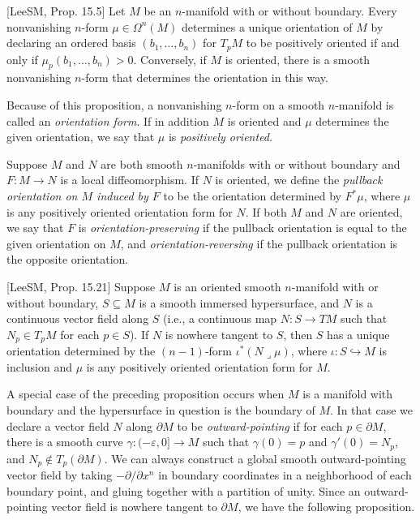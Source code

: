 \begin{proposition}
\label{prop:orientation-determined-by-n-form}
[LeeSM, Prop. 15.5]
Let $M$ be an $n$-manifold with or without boundary. Every nonvanishing $n$-form $\mu \in \Omega^n(M)$ determines a unique orientation of $M$ by declaring an ordered basis $(b_1, \ldots, b_n)$ for $T_p M$ to be positively oriented if and only if $\mu_p(b_1, \ldots, b_n) > 0$. Conversely, if $M$ is oriented, there is a smooth nonvanishing $n$-form that determines the orientation in this way.
\end{proposition}

Because of this proposition, a nonvanishing $n$-form on a smooth $n$-manifold is called an \textit{orientation form}. If in addition $M$ is oriented and $\mu$ determines the given orientation, we say that $\mu$ is \textit{positively oriented}.

Suppose $M$ and $N$ are both smooth $n$-manifolds with or without boundary and $F : M \to N$ is a local diffeomorphism. If $N$ is oriented, we define the \textit{pullback orientation on $M$ induced by $F$} to be the orientation determined by $F^* \mu$, where $\mu$ is any positively oriented orientation form for $N$. If both $M$ and $N$ are oriented, we say that $F$ is \textit{orientation-preserving} if the pullback orientation is equal to the given orientation on $M$, and \textit{orientation-reversing} if the pullback orientation is the opposite orientation.

\begin{proposition}
\label{prop:orientation-of-hypersurface}
[LeeSM, Prop. 15.21]
Suppose $M$ is an oriented smooth $n$-manifold with or without boundary, $S \subseteq M$ is a smooth immersed hypersurface, and $N$ is a continuous vector field along $S$ (i.e., a continuous map $N : S \to TM$ such that $N_p \in T_p M$ for each $p \in S$). If $N$ is nowhere tangent to $S$, then $S$ has a unique orientation determined by the $(n-1)$-form $\iota^*(N \lrcorner \mu)$, where $\iota : S \hookrightarrow M$ is inclusion and $\mu$ is any positively oriented orientation form for $M$.
\end{proposition}

A special case of the preceding proposition occurs when $M$ is a manifold with boundary and the hypersurface in question is the boundary of $M$. In that case we declare a vector field $N$ along $\partial M$ to be \textit{outward-pointing} if for each $p \in \partial M$, there is a smooth curve $\gamma : (-\varepsilon, 0] \to M$ such that $\gamma(0) = p$ and $\gamma'(0) = N_p$, and $N_p \notin T_p(\partial M)$. We can always construct a global smooth outward-pointing vector field by taking $-\partial/\partial x^n$ in boundary coordinates in a neighborhood of each boundary point, and gluing together with a partition of unity. Since an outward-pointing vector field is nowhere tangent to $\partial M$, we have the following proposition.

